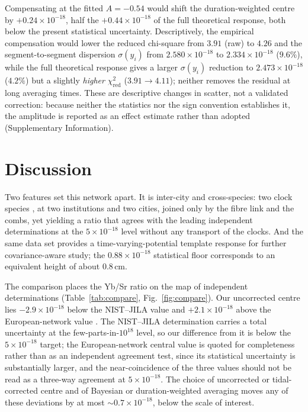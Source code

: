 \documentclass[11pt,a4paper]{article}
\newcommand{\e}[1]{\times 10^{#1}}
\begin{document}
Compensating at the fitted $A=-0.54$ would shift the duration-weighted
centre by $+0.24\e{-18}$, half the $+0.44\e{-18}$ of the full theoretical
response, both below the present statistical uncertainty. Descriptively,
the empirical compensation would lower the reduced chi-square from
$3.91$ (raw) to $4.26$ and the segment-to-segment dispersion
$\sigma(y_i)$ from $2.580\e{-18}$ to $2.334\e{-18}$
($9.6\%$), while the full theoretical response gives a larger
$\sigma(y_i)$ reduction to $2.473\e{-18}$ ($4.2\%$) but a slightly
\emph{higher} $\chi^{2}_{\mathrm{red}}$ ($3.91\to4.11$); neither removes the
residual at long averaging times. These are
descriptive changes in scatter, not a validated correction: because
neither the statistics nor the sign convention establishes it, the
amplitude is reported as an effect estimate rather than adopted
(Supplementary Information).



\section{Discussion}
\label{sec:caveats}

Two features set this network apart. It is inter-city and cross-species:
two clock species \citep{zhu2026yb, jia2026sr}, at two institutions and
two cities, joined only by the fibre link and the combs, yet yielding a
ratio that agrees with the leading independent determinations at the
$5\e{-18}$ level without any transport of the clocks. And the same data
set provides a time-varying-potential template response for further
covariance-aware study; the $0.88\e{-18}$ statistical floor corresponds to
an equivalent height of about $0.8$\,cm.

The comparison places the Yb/Sr ratio on the map of independent
determinations (Table~\ref{tab:compare}, Fig.~\ref{fig:compare}). Our
uncorrected centre lies
$-2.9\e{-18}$ below the NIST--JILA value \citep{aeppli2026nist} and
$+2.1\e{-18}$ above the European-network value
\citep{pizzocaro2026european}. The NIST--JILA determination carries a total
uncertainty at the few-parts-in-$10^{18}$ level, so our difference from it
is below the $5\e{-18}$ target; the European-network central value is
quoted for completeness rather than as an independent agreement test,
since its statistical uncertainty is substantially larger, and the
near-coincidence of the three values should not be read as a three-way
agreement at $5\e{-18}$. The choice of uncorrected or tidal-corrected
centre and of Bayesian or duration-weighted averaging moves any of these
deviations by at most $\sim0.7\e{-18}$, below the scale of interest.
\end{document}
